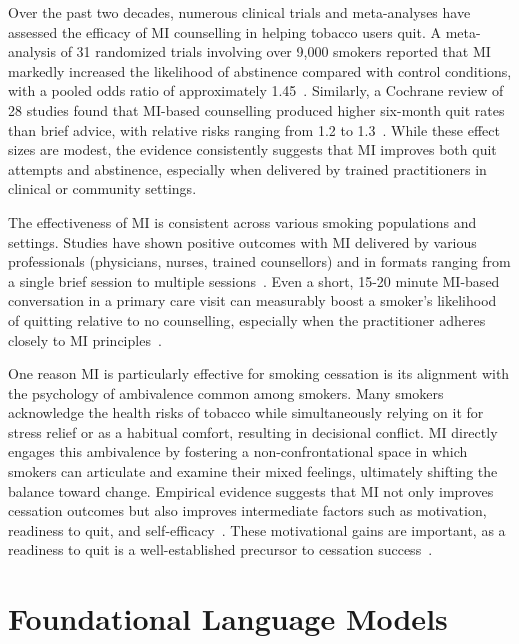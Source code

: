 Over the past two decades, numerous clinical trials and meta-analyses have assessed the efficacy of MI counselling in helping tobacco users quit. A meta-analysis of 31 randomized trials involving over 9,000 smokers reported that MI markedly increased the likelihood of abstinence compared with control conditions, with a pooled odds ratio of approximately 1.45~\cite{Heckman2010}. Similarly, a Cochrane review of 28 studies found that MI-based counselling produced higher six-month quit rates than brief advice, with relative risks ranging from 1.2 to 1.3~\cite{Lindson2015}. While these effect sizes are modest, the evidence consistently suggests that MI improves both quit attempts and abstinence, especially when delivered by trained practitioners in clinical or community settings.

The effectiveness of MI is consistent across various smoking populations and settings. Studies have shown positive outcomes with MI delivered by various professionals (physicians, nurses, trained counsellors) and in formats ranging from a single brief session to multiple sessions~\cite{Lindson2015}. Even a short, 15-20 minute MI-based conversation in a primary care visit can measurably boost a smoker's likelihood of quitting relative to no counselling, especially when the practitioner adheres closely to MI principles~\cite{zanjani2008effectiveness}.


One reason MI is particularly effective for smoking cessation is its alignment with the psychology of ambivalence common among smokers. Many smokers acknowledge the health risks of tobacco while simultaneously relying on it for stress relief or as a habitual comfort, resulting in decisional conflict. MI directly engages this ambivalence by fostering a non-confrontational space in which smokers can articulate and examine their mixed feelings, ultimately shifting the balance toward change. Empirical evidence suggests that MI not only improves cessation outcomes but also improves intermediate factors such as motivation, readiness to quit, and self-efficacy~\cite{Boudreaux2012, Hettema2005}. These motivational gains are important, as a readiness to quit is a well-established precursor to cessation success~\cite{West2006}.




\section{Foundational Language Models} \label{sec:foundational_models}


